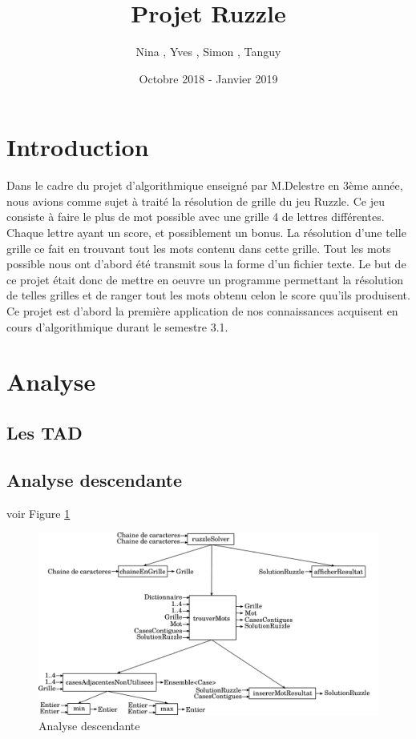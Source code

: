 \documentclass[a4paper]{article}
\title{Projet Ruzzle}
\author{Nina \noun{Lardiere}, Yves \noun{Le Guennec}, Simon \noun{Lebeaud}, Tanguy \noun{Leclerc}}
\date{Octobre 2018 - Janvier 2019}
\begin{document}
	\maketitle
	\tableofcontents
	\newpage
	\section{Introduction}
	Dans le cadre du projet d'algorithmique enseigné par M.Delestre en 3ème année, nous avions comme sujet à traité la résolution de grille du jeu Ruzzle. Ce jeu consiste à faire le plus de mot possible avec une grille 4 de lettres différentes. Chaque lettre ayant un score, et possiblement un bonus. La résolution d'une telle grille ce fait en trouvant tout les mots contenu dans cette grille.
	Tout les mots possible nous ont d'abord été transmit sous la forme d'un fichier texte. Le but de ce projet était donc de mettre en oeuvre un programme permettant la résolution de telles grilles et de ranger tout les mots obtenu celon le score quu'ils produisent. Ce projet est d'abord la première application de nos connaissances acquisent en cours d'algorithmique durant le semestre 3.1.

	\section{Analyse}
		\subsection{Les TAD}
			

		\subsection{Analyse descendante}
			voir Figure \ref{fig:AD}
			\begin{figure}
				\centering \includegraphics[width=1\textwidth]{./analyseDescendante/analyseDescendante}
				\caption{\label{fig:AD}Analyse descendante}
			\end{figure}
\end{document}
